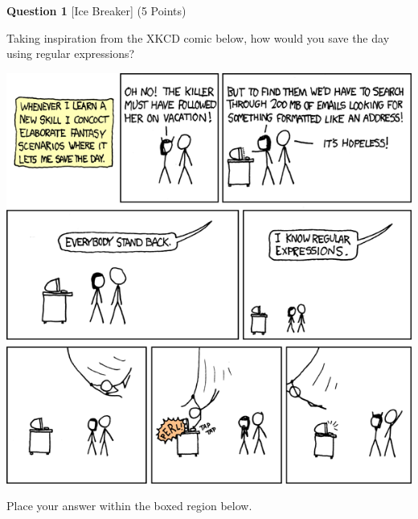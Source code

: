 \documentclass{report}
\renewcommand{\headrulewidth}{0mm}
\renewcommand{\footrulewidth}{0mm}
\begin{document}
\pagestyle{fancy}
\fancyhead{}
\renewcommand{\headrulewidth}{0.1mm}
\fancyfoot{}
\fancyfoot[R]{\thepage}
\renewcommand{\footrulewidth}{0.1mm}




\begin{minipage}{\textwidth}
    \noindent
        \textbf{Question 1} [Ice Breaker] (5 Points)
    \vspace{0.25cm}

    \noindent
    Taking inspiration from the XKCD comic below,
how would you save the day using regular expressions?

\begin{center}

\includegraphics[width=1.00\textwidth]{images/Regular Expressions -- Answer Key/000.png}

\end{center}

    \vspace{0.25cm}

    Place your answer within the boxed region below.

        \vspace{0.25cm}


        \begin{center}


        \end{center}
\end{minipage}
\end{document}
